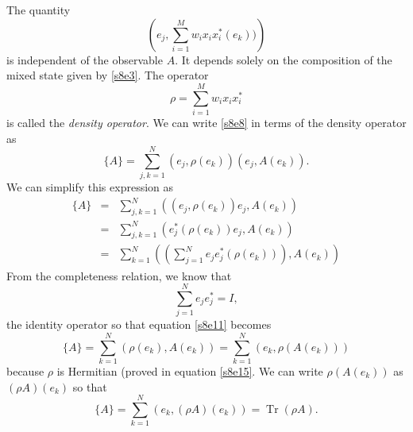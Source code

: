 \documentclass{article}
\numberwithin{equation}{section}
\newcommand{\eav}[1]{\{ #1 \}}           %
\DeclareMathOperator{\Tr}{Tr}
\theoremstyle{plain}
\numberwithin{thm}{section}
\theoremstyle{plain}
\numberwithin{prop}{section}
\theoremstyle{definition}
\numberwithin{defn}{section}
\theoremstyle{remark}
\begin{document}
The quantity
\begin{equation}\label{s8e8}
\left(e_j, \sum_{i=1}^M w_ix_ix_i^\ast(e_k))\right)
\end{equation}
is independent of the observable $A$. It depends solely on the composition of
the mixed state given by \eqref{s8e3}. The operator
\begin{equation}\label{s8e9}
\rho = \sum_{i=1}^M w_ix_ix_i^\ast
\end{equation}
is called the \emph{density operator}. We can write \eqref{s8e8} in terms of
the density operator as
\begin{equation}\label{s8e10}
\eav{A} = \sum_{j,k=1}^N (e_j, \rho(e_k))(e_j, A(e_k)).
\end{equation}
We can simplify this expression as
\begin{eqnarray}
\eav{A} &=& \sum_{j,k=1}^N((e_j, \rho(e_k))e_j, A(e_k)) \nonumber \\
 &=& \sum_{j,k=1}^N(e_j^\ast(\rho(e_k))e_j, A(e_k)) \nonumber \\
 &=& \sum_{k=1}^N\left(\left(\sum_{j=1}^N e_j e_j^\ast (\rho(e_k))\right), 
     A(e_k)\right) \label{s8e11} 
\end{eqnarray}
From the completeness relation, we know that
\begin{equation}\label{s8e12}
\sum_{j=1}^N e_j e_j^\ast = I,
\end{equation}
the identity operator so that equation \eqref{s8e11} becomes
\begin{equation}\label{s8e13}
\eav{A} = \sum_{k=1}^N (\rho(e_k), A(e_k)) = \sum_{k=1}^N(e_k, \rho(A(e_k)))
\end{equation}
because $\rho$ is Hermitian (proved in equation \eqref{s8e15}. We can write 
$\rho(A(e_k))$ as $(\rho A)(e_k)$ so that 
\begin{equation}\label{s8e14}
\eav{A} = \sum_{k=1}^N(e_k, (\rho A)(e_k)) = \Tr(\rho A).
\end{equation}
\end{document}

